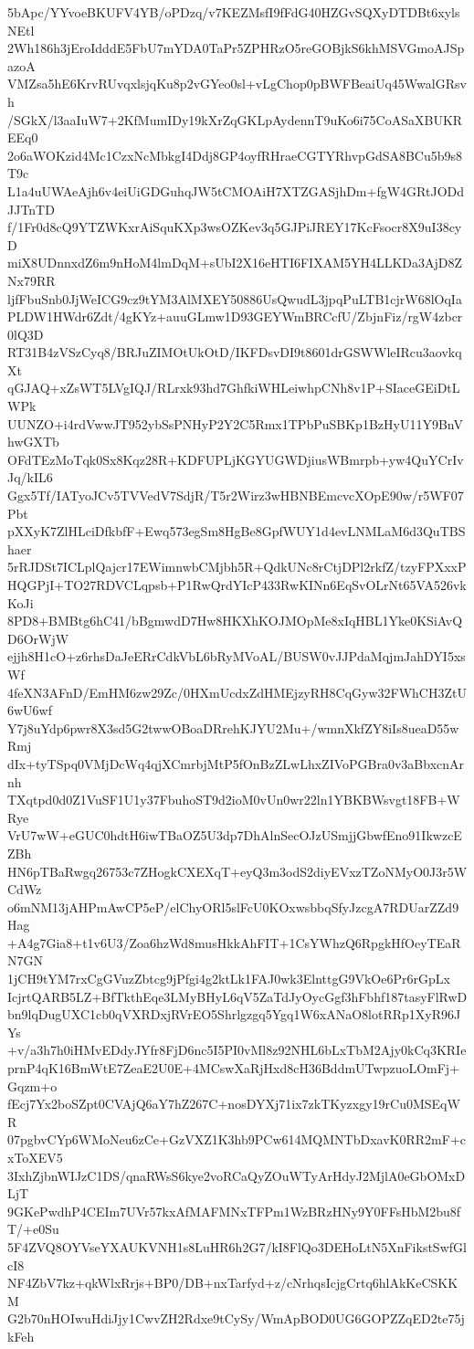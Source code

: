 5bApc/YYvoeBKUFV4YB/oPDzq/v7KEZMsfI9fFdG40HZGvSQXyDTDBt6xylsNEtl
2Wh186h3jEroIdddE5FbU7mYDA0TaPr5ZPHRzO5reGOBjkS6khMSVGmoAJSpazoA
VMZsa5hE6KrvRUvqxlsjqKu8p2vGYeo0sl+vLgChop0pBWFBeaiUq45WwalGRsvh
/SGkX/l3aaIuW7+2KfMumIDy19kXrZqGKLpAydennT9uKo6i75CoASaXBUKREEq0
2o6aWOKzid4Mc1CzxNcMbkgI4Ddj8GP4oyfRHraeCGTYRhvpGdSA8BCu5b9s8T9c
L1a4uUWAeAjh6v4eiUiGDGuhqJW5tCMOAiH7XTZGASjhDm+fgW4GRtJODdJJTnTD
f/1Fr0d8cQ9YTZWKxrAiSquKXp3wsOZKev3q5GJPiJREY17KcFsocr8X9uI38cyD
miX8UDnnxdZ6m9nHoM4lmDqM+sUbI2X16eHTI6FIXAM5YH4LLKDa3AjD8ZNx79RR
ljfFbuSnb0JjWeICG9cz9tYM3AlMXEY50886UsQwudL3jpqPuLTB1cjrW68lOqIa
PLDW1HWdr6Zdt/4gKYz+auuGLmw1D93GEYWmBRCcfU/ZbjnFiz/rgW4zbcr0lQ3D
RT31B4zVSzCyq8/BRJuZIMOtUkOtD/IKFDsvDI9t8601drGSWWleIRcu3aovkqXt
qGJAQ+xZsWT5LVgIQJ/RLrxk93hd7GhfkiWHLeiwhpCNh8v1P+SIaceGEiDtLWPk
UUNZO+i4rdVwwJT952ybSsPNHyP2Y2C5Rmx1TPbPuSBKp1BzHyU11Y9BnVhwGXTb
OFdTEzMoTqk0Sx8Kqz28R+KDFUPLjKGYUGWDjiusWBmrpb+yw4QuYCrIvJq/kIL6
Ggx5Tf/IATyoJCv5TVVedV7SdjR/T5r2Wirz3wHBNBEmcvcXOpE90w/r5WF07Pbt
pXXyK7ZlHLciDfkbfF+Ewq573egSm8HgBe8GpfWUY1d4evLNMLaM6d3QuTBShaer
5rRJDSt7ICLplQajcr17EWimnwbCMjbh5R+QdkUNc8rCtjDPl2rkfZ/tzyFPXxxP
HQGPjI+TO27RDVCLqpsb+P1RwQrdYIcP433RwKINn6EqSvOLrNt65VA526vkKoJi
8PD8+BMBtg6hC41/bBgmwdD7Hw8HKXhKOJMOpMe8xIqHBL1Yke0KSiAvQD6OrWjW
ejjh8H1cO+z6rhsDaJeERrCdkVbL6bRyMVoAL/BUSW0vJJPdaMqjmJahDYI5xsWf
4feXN3AFnD/EmHM6zw29Zc/0HXmUcdxZdHMEjzyRH8CqGyw32FWhCH3ZtU6wU6wf
Y7j8uYdp6pwr8X3sd5G2twwOBoaDRrehKJYU2Mu+/wmnXkfZY8iIs8ueaD55wRmj
dIx+tyTSpq0VMjDcWq4qjXCmrbjMtP5fOnBzZLwLhxZIVoPGBra0v3aBbxcnArnh
TXqtpd0d0Z1VuSF1U1y37FbuhoST9d2ioM0vUn0wr22ln1YBKBWsvgt18FB+WRye
VrU7wW+eGUC0hdtH6iwTBaOZ5U3dp7DhAlnSecOJzUSmjjGbwfEno91IkwzcEZBh
HN6pTBaRwgq26753c7ZHogkCXEXqT+eyQ3m3odS2diyEVxzTZoNMyO0J3r5WCdWz
o6mNM13jAHPmAwCP5eP/elChyORl5slFcU0KOxwsbbqSfyJzcgA7RDUarZZd9Hag
+A4g7Gia8+t1v6U3/Zoa6hzWd8musHkkAhFIT+1CsYWhzQ6RpgkHfOeyTEaRN7GN
1jCH9tYM7rxCgGVuzZbtcg9jPfgi4g2ktLk1FAJ0wk3ElnttgG9VkOe6Pr6rGpLx
IcjrtQARB5LZ+BfTkthEqe3LMyBHyL6qV5ZaTdJyOycGgf3hFbhf187tasyFlRwD
bn9lqDugUXC1cb0qVXRDxjRVrEO5Shrlgzgq5Ygq1W6xANaO8lotRRp1XyR96JYs
+v/a3h7h0iHMvEDdyJYfr8FjD6nc5I5PI0vMl8z92NHL6bLxTbM2Ajy0kCq3KRIe
prnP4qK16BmWtE7ZeaE2U0E+4MCswXaRjHxd8cH36BddmUTwpzuoLOmFj+Gqzm+o
fEcj7Yx2boSZpt0CVAjQ6aY7hZ267C+nosDYXj71ix7zkTKyzxgy19rCu0MSEqWR
07pgbvCYp6WMoNeu6zCe+GzVXZ1K3hb9PCw614MQMNTbDxavK0RR2mF+cxToXEV5
3IxhZjbnWIJzC1DS/qnaRWsS6kye2voRCaQyZOuWTyArHdyJ2MjlA0eGbOMxDLjT
9GKePwdhP4CEIm7UVr57kxAfMAFMNxTFPm1WzBRzHNy9Y0FFsHbM2bu8fT/+e0Su
5F4ZVQ8OYVseYXAUKVNH1s8LuHR6h2G7/kI8FlQo3DEHoLtN5XnFikstSwfGlcI8
NF4ZbV7kz+qkWlxRrjs+BP0/DB+nxTarfyd+z/cNrhqsIcjgCrtq6hlAkKeCSKKM
G2b70nHOIwuHdiJjy1CwvZH2Rdxe9tCySy/WmApBOD0UG6GOPZZqED2te75jkFeh
